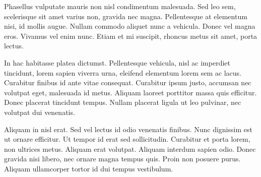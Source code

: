 \documentclass{article}
\begin{document}
Phasellus vulputate mauris non nisl condimentum malesuada. Sed leo sem, scelerisque sit amet varius non, gravida nec magna. Pellentesque at elementum nisi, id mollis augue. Nullam commodo aliquet nunc a vehicula. Donec vel magna eros. Vivamus vel enim nunc. Etiam et mi suscipit, rhoncus metus sit amet, porta lectus.

In hac habitasse platea dictumst. Pellentesque vehicula, nisl ac imperdiet tincidunt, lorem sapien viverra urna, eleifend elementum lorem sem ac lacus. Curabitur finibus id ante vitae consequat. Curabitur ipsum justo, accumsan nec volutpat eget, malesuada id metus. Aliquam laoreet porttitor massa quis efficitur. Donec placerat tincidunt tempus. Nullam placerat ligula ut leo pulvinar, nec volutpat dui venenatis.

Aliquam in nisl erat. Sed vel lectus id odio venenatis finibus. Nunc dignissim est ut ornare efficitur. Ut tempor id erat sed sollicitudin. Curabitur et porta lorem, non ultrices metus. Aliquam erat volutpat. Aliquam interdum sapien odio. Donec gravida nisi libero, nec ornare magna tempus quis. Proin non posuere purus. Aliquam ullamcorper tortor id dui tempus vestibulum. 
\end{document}
